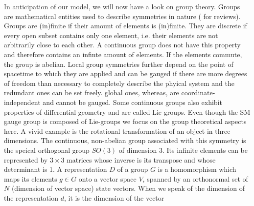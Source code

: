 In anticipation of our model, we will now have a look on group theory. Groups are mathematical entities used to describe symmetries in nature
(\cite{pierre}\cite{georgi} for reviews). Groups are (in)finite if their amount of elements is (in)finite. They are discrete if every open subset
contains only one element, i.e. their elements are not arbitrarily close to each other. A continuous group does not have this property and therefore
contains an infinte amount of elements. If the elements commute, the group is abelian. 
Local group symmetries further depend on the point of spacetime to which they are applied and can be gauged if there are more degrees of freedom
than necessary to completely describe the phyical system and the redundant ones can be set freely. global ones,
whereas, are coordinate-independent and cannot be gauged. 
Some continuous groups also exhibit properties of differential geometry and are called Lie-groups. Even
though the SM gauge group is composed of Lie-groups we focus on the group theoretical aspects here. A vivid example is the rotational transformation
of an object in three dimensions. The continuous, non-abelian group associated with this symmetry is the speical orthogonal group 
$SO(3)$ of dimension 3. Its infinite elements can be represented by $3\times3$ matrices whose inverse is its 
transpose and whose determinant is 1.
% 
% 
% 
\noindent A representation $D$ of a group $G$ is a homomorphism which maps its elements $g\in G$ onto a vector space $V$, spanned by an orthonormal
set of $N$ (dimension of vector space) state vectors. When we speak of the dimension of the representation $d$, it is the dimension of the vector 
